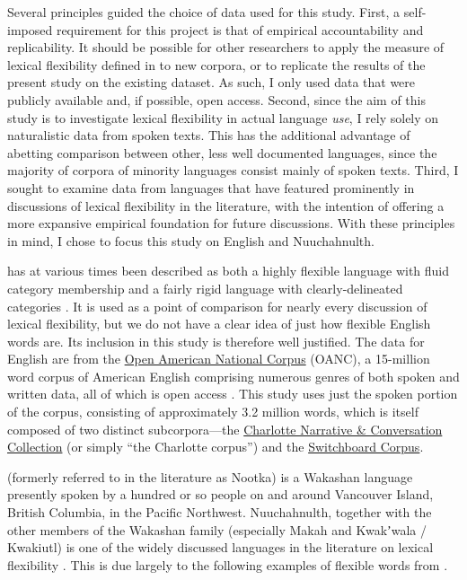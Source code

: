 Several principles guided the choice of data used for this study. First, a self-imposed requirement for this project is that of empirical accountability and replicability. It should be possible for other researchers to apply the measure of lexical flexibility defined in  to new corpora, or to replicate the results of the present study on the existing dataset. As such, I only used data that were publicly available and, if possible, open access. Second, since the aim of this study is to investigate lexical flexibility in actual language \emph{use}, I rely solely on naturalistic data from spoken texts. This has the additional advantage of abetting comparison between other, less well documented languages, since the majority of corpora of minority languages consist mainly of spoken texts. Third, I sought to examine data from languages that have featured prominently in discussions of lexical flexibility in the literature, with the intention of offering a more expansive empirical foundation for future discussions. With these principles in mind, I chose to focus this study on English and Nuuchahnulth.

 has at various times been described as both a highly flexible language with fluid category membership \parencites[47--48]{Crystal1967}{Vonen1994}[111]{Farrell2001}{Cannon1985} and a fairly rigid language with clearly-delineated categories \parencites[710]{Rijkhoff2007}[4, 11, 12]{SchachterShopen2007}[122, 126]{Velupillai2012}. It is used as a point of comparison for nearly every discussion of lexical flexibility, but we do not have a clear idea of just how flexible English words are. Its inclusion in this study is therefore well justified. The data for English are from the \href{http://www.anc.org/}{Open American National Corpus} (OANC), a 15-million word corpus of American English comprising numerous genres of both spoken and written data, all of which is open access \parencite{OANC}. This study uses just the spoken portion of the corpus, consisting of approximately 3.2 million words, which is itself composed of two distinct subcorpora—the \href{https://newsouthvoices.uncc.edu}{Charlotte Narrative \& Conversation Collection} (or simply \enquote{the Charlotte corpus}) and the \href{https://catalog.ldc.upenn.edu/LDC97S62}{Switchboard Corpus}.

 (formerly referred to in the literature as Nootka) is a Wakashan language presently spoken by a hundred or so people on and around Vancouver Island, British Columbia, in the Pacific Northwest. Nuuchahnulth, together with the other members of the Wakashan family (especially Makah and Kwakʼwala / Kwakiutl) is one of the widely discussed languages in the literature on lexical flexibility \parencites{Swadesh1939}{Jacobsen1979}{Braithwaite2015}. This is due largely to the following examples of flexible words from \textcite{Swadesh1939}.

